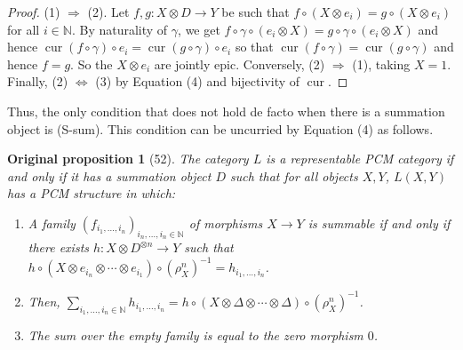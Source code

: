 \documentclass[10pt,a4paper]{article}
\newcommand{\cur}{\operatorname{cur}}
\newtheorem*{originalprop}{Original proposition}
\begin{document}
\begin{proof}(1) $\Rightarrow$ (2). Let $f,g:X\otimes D\to Y$ be such that $f\circ(X\otimes e_i)=g\circ(X\otimes e_i)$ for all $i\in\mathbb N$. By naturality of $\gamma$, we get $f\circ\gamma\circ(e_i\otimes X)=g\circ\gamma\circ(e_i\otimes X)$ and hence $\cur(f\circ\gamma)\circ e_i=\cur(g\circ\gamma)\circ e_i$ so that $\cur(f\circ\gamma)=\cur(g\circ\gamma)$ and hence $f=g$. So the $X\otimes e_i$ are jointly epic. Conversely, (2) $\Rightarrow$ (1), taking $X=1$. Finally, (2) $\Leftrightarrow$ (3) by Equation (4) and bijectivity of $\cur$.\end{proof}
Thus, the only condition that does not hold de facto when there is a summation object is (S-sum). This condition can be uncurried by Equation (4) as follows.

\begin{originalprop}[52] The category $L$ is a representable PCM category if and only if it has a summation object $D$ such that for all objects $X,Y$, $L(X,Y)$ has a PCM structure in which:
\begin{enumerate}\item A family $(f_{i_1,\ldots,i_n})_{i_n,\ldots,i_n\in\mathbb N}$ of morphisms $X\to Y$ is summable if and only if there exists $h:X\otimes D^{\otimes n}\to Y$ such that $h\circ(X\otimes e_{i_n}\otimes\cdots\otimes e_{i_1})\circ(\rho_X^n)^{-1}=h_{i_1,\ldots,i_n}$.
\item Then, $\sum_{i_1,\ldots,i_n\in\mathbb N}h_{i_1,\ldots,i_n}=h\circ(X\otimes\Delta\otimes\cdots\otimes\Delta)\circ(\rho_X^n)^{-1}$.
\item The sum over the empty family is equal to the zero morphism $0$.
\end{enumerate}\end{originalprop}
\end{document}
